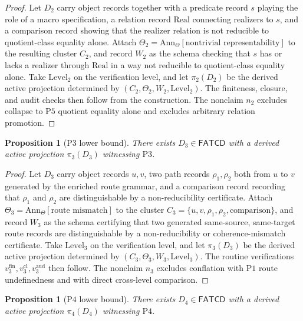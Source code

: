 \documentclass[11pt]{article}
\newtheorem{proposition}[theorem]{Proposition}
\theoremstyle{definition}
\newcommand{\FATCD}{\ensuremath{\mathsf{FATCD}}}
\newcommand{\Pone}{\ensuremath{\mathrm{P1}}}
\newcommand{\Pthree}{\ensuremath{\mathrm{P3}}}
\newcommand{\Pfour}{\ensuremath{\mathrm{P4}}}
\newcommand{\Pfive}{\ensuremath{\mathrm{P5}}}
\begin{document}
\begin{proof}
Let \(D_2\) carry object records together with a predicate record \(s\)
playing the role of a macro specification, a relation record
\(\mathrm{Real}\) connecting realizers to \(s\), and a comparison
record showing that the realizer relation is not reducible to
quotient-class equality alone. Attach
\(\Theta_2 = \mathrm{Ann}_\Theta[\text{nontrivial representability}]\)
to the resulting cluster \(C_2\), and record \(W_2\) as the schema
checking that \(s\) has or lacks a realizer through \(\mathrm{Real}\) in
a way not reducible to quotient-class equality alone. Take
\(\mathrm{Level}_2\) on the verification level, and let \(\pi_2(D_2)\)
be the derived active projection determined by
\((C_2,\Theta_2,W_2,\mathrm{Level}_2)\). The finiteness, closure, and
audit checks then follow from the construction. The
nonclaim \(n_2\) excludes collapse to \Pfive{} quotient equality alone
and excludes arbitrary relation promotion.
\end{proof}

\begin{proposition}[\Pthree{} lower bound]\label{prop:p3-witness}
There exists \(D_3 \in \FATCD{}\) with a derived active projection
\(\pi_3(D_3)\) witnessing \Pthree{}.
\end{proposition}

\begin{proof}
Let \(D_3\) carry object records \(u, v\), two path records
\(\rho_1, \rho_2\) both from \(u\) to \(v\) generated by the enriched
route grammar, and a comparison record recording that \(\rho_1\) and
\(\rho_2\) are distinguishable by a non-reducibility certificate.
Attach \(\Theta_3 = \mathrm{Ann}_\Theta[\text{route mismatch}]\) to the
cluster \(C_3 = \{u, v, \rho_1, \rho_2, \text{comparison}\}\), and
record \(W_3\) as the schema certifying that two generated same-source,
same-target route records are distinguishable by a non-reducibility or
coherence-mismatch certificate. Take \(\mathrm{Level}_3\) on the
verification level, and let \(\pi_3(D_3)\) be the derived active
projection determined by
\((C_3,\Theta_3,W_3,\mathrm{Level}_3)\). The routine verifications
\(v_3^{\mathrm{fin}}, v_3^{\mathrm{cl}}, v_3^{\mathrm{aud}}\) then
follow. The nonclaim \(n_3\) excludes conflation with
\Pone{} route undefinedness and with direct cross-level comparison.
\end{proof}

\begin{proposition}[\Pfour{} lower bound]\label{prop:p4-witness}
There exists \(D_4 \in \FATCD{}\) with a derived active projection
\(\pi_4(D_4)\) witnessing \Pfour{}.
\end{proposition}
\end{document}

